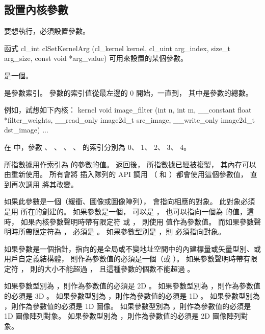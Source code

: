 \subsection{設置內核參數}

要想執行，必須設置參數。

函式
\startclc
cl_int clSetKernelArg (cl_kernel kernel,
			cl_uint arg_index,
			size_t arg_size,
			const void *arg_value)
\stopclc
可用來設置的某個參數。

 是一個。

 是參數索引。
參數的索引值從最左邊的 0 開始，一直到，
其中是參數的總數。

例如，試想如下內核：
\startclc
kernel void
image_filter (int n, int m,
		__constant float *filter_weights,
		__read_only image2d_t src_image,
		__write_only image2d_t dst_image)
{
	...
}
\stopclc

在  中，參數 、 、 、
 、  的索引分別為 0、 1、 2、 3、 4。

 所指數據用作索引為  的參數的值。
 返回後，  所指數據已經被複製，
其內存可以由重新使用。
所有會將  插入隊列的 API 調用
（  和 ）都會使用這個參數值，
直到再次調用  將其改變。

如果此參數是一個（緩衝、圖像或圖像陣列），
  會指向相應的對象。
此對象必須是用  所在的創建的。
如果參數是一個，  可以是 ，
也可以指向一個為  的值，這時，
如果內核參數聲明時帶有限定符  或 ，
則使用  值作為參數值。
而如果參數聲明時所帶限定符為 ，  必須是 。
如果參數型別是 ，則  必須指向對象。

如果參數是一個指針，指向的是全局或不變地址空間中的內建標量或矢量型別、或用戶自定義結構體，
則作為參數值的必須是一個（或 ）。
如果參數聲明時帶有限定符 ，
則的大小不能超過 ，
且這種參數的個數不能超過 。

如果參數型別為 ，則作為參數值的必須是 2D 。
如果參數型別為 ，則作為參數值的必須是 3D 。
如果參數型別為 ，則作為參數值的必須是 1D 。
如果參數型別為 ，則作為參數值的必須是 1D 圖像。
如果參數型別為 ，則作為參數值的必須是 1D 圖像陣列對象。
如果參數型別為 ，則作為參數值的必須是 2D 圖像陣列對象。

